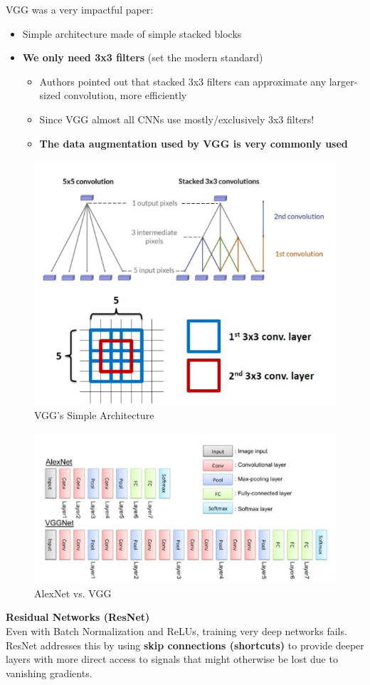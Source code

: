 VGG was a very impactful paper:

\begin{itemize}
    \item Simple architecture made of simple stacked blocks
\item \textbf{We only need 3x3 filters} (set the modern standard)
\begin{itemize}
    \item Authors pointed out that stacked 3x3 filters can approximate any larger-sized convolution, more efficiently
    \item Since VGG almost all CNNs use mostly/exclusively 3x3 filters!
\item \textbf{The data augmentation used by VGG is very commonly used}
\end{itemize}

\end{itemize}

\begin{figure}[h!t]
    \centering
    \includegraphics[width=0.5\linewidth]{vgg2.png}
    \caption{VGG's Simple Architecture}
    \label{fig:enter-label}
\end{figure}
\begin{figure}[h!t]
    \centering
    \includegraphics[width=0.5\linewidth]{vggvsalex.png}
    \caption{AlexNet vs. VGG}
    \label{fig:enter-label}
\end{figure}

\textbf{Residual Networks (ResNet)}\\

Even with Batch Normalization and ReLUs, training very deep networks fails. ResNet addresses this by using \textbf{skip connections (shortcuts)} to provide deeper layers with more direct access to signals that might otherwise be lost due to vanishing gradients. \\

